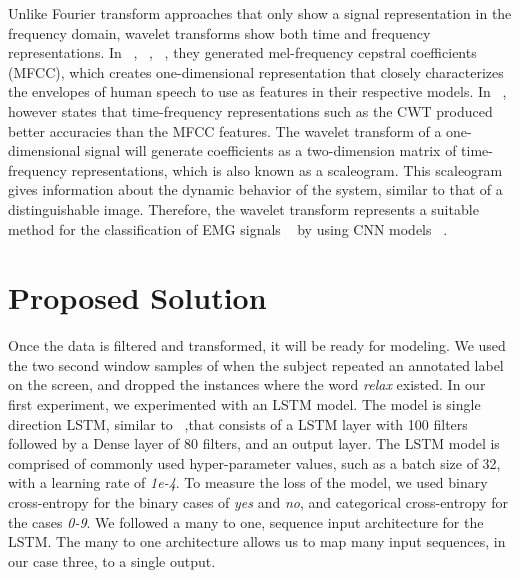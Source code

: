 \documentclass[conference]{IEEEtran}
\begin{document}
Unlike Fourier transform approaches that only show a signal representation in the frequency domain, wavelet transforms show both time and frequency representations. In ~\cite{janke_emg--speech:_2017}, ~\cite{kapur_alterego:_2018}, ~\cite{diener_session-independent_nodate}, they generated mel-frequency cepstral coefficients (MFCC), which creates one-dimensional representation that closely characterizes the envelopes of human speech to use as features in their respective models. In ~\cite{huzaifah_comparison_2017}, however states that time-frequency representations such as the CWT produced better accuracies than the MFCC features. The wavelet transform of a one-dimensional signal will generate coefficients as a two-dimension matrix of time-frequency representations, which is also known as a scaleogram. This scaleogram gives information about the dynamic behavior of the system, similar to that of a distinguishable image. Therefore, the wavelet transform represents a suitable method for the classification of EMG signals ~\cite{pauk_419._2008} by using CNN models ~\cite{huzaifah_comparison_2017}.

\section{Proposed Solution} \label{Proposed Solution}
Once the data is filtered and transformed, it will be ready for modeling. We used the two second window samples of when the subject repeated an annotated label on the screen, and dropped the instances where the word \textit{relax} existed. In our first experiment, we experimented with an LSTM model. The model is single direction LSTM, similar to ~\cite{janke_emg--speech:_2017},that consists of a LSTM layer with 100 filters followed by a Dense layer of 80 filters, and an output layer. The LSTM model is comprised of commonly used hyper-parameter values, such as a batch size of 32, with a learning rate of \textit{1e-4}. To measure the loss of the model, we used binary cross-entropy for the binary cases of \textit{yes} and \textit{no}, and categorical cross-entropy for the cases \textit{0-9}. We followed a many to one, sequence input architecture for the LSTM. The many to one architecture allows us to map many input sequences, in our case three, to a single output.
\end{document}
